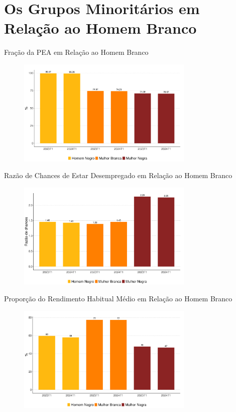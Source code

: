 \documentclass[10pt, xcolor=x11names,compress]{beamer}
\begin{document}
	
	\section{Os Grupos Minoritários em Relação ao Homem Branco} 
	\begin{frame}{Fração da PEA em Relação ao Homem Branco}
		\begin{figure}
			\centering
			\includegraphics[width = 0.75\textwidth]{figures_output/frac_pea.pdf}
		\end{figure}
	\end{frame}
	
	\begin{frame}{Razão de Chances de Estar Desempregado em Relação ao Homem Branco}
		\begin{figure}
			\centering
			\includegraphics[width = 0.75\textwidth]{figures_output/frac_unemp.pdf}
		\end{figure}
	\end{frame}
	
	\begin{frame}{Proporção do Rendimento Habitual Médio em Relação ao Homem Branco}
		\begin{figure}
			\centering
			\includegraphics[width = 0.75\textwidth]{figures_output/frac_rendimento_habitual.pdf}
		\end{figure}
	\end{frame}
\end{document}
